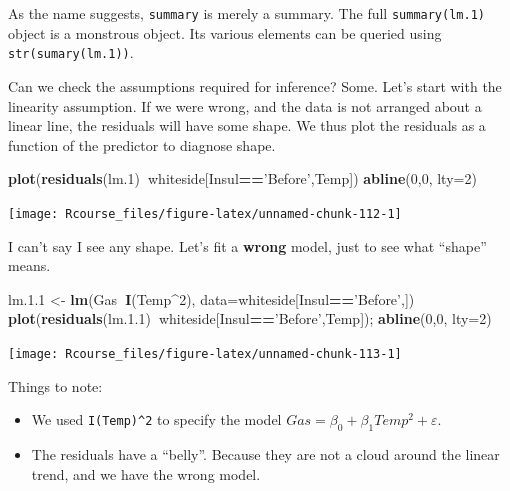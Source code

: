 \documentclass[]{book}
\newenvironment{Shaded}{\begin{snugshade}}{\end{snugshade}}
\newcommand{\KeywordTok}[1]{\textcolor[rgb]{0.13,0.29,0.53}{\textbf{#1}}}
\newcommand{\DataTypeTok}[1]{\textcolor[rgb]{0.13,0.29,0.53}{#1}}
\newcommand{\DecValTok}[1]{\textcolor[rgb]{0.00,0.00,0.81}{#1}}
\newcommand{\FloatTok}[1]{\textcolor[rgb]{0.00,0.00,0.81}{#1}}
\newcommand{\StringTok}[1]{\textcolor[rgb]{0.31,0.60,0.02}{#1}}
\newcommand{\OperatorTok}[1]{\textcolor[rgb]{0.81,0.36,0.00}{\textbf{#1}}}
\newcommand{\NormalTok}[1]{#1}
\providecommand{\tightlist}{%
  \setlength{\itemsep}{0pt}\setlength{\parskip}{0pt}}
\theoremstyle{definition}
\theoremstyle{definition}
\theoremstyle{definition}
\theoremstyle{remark}
\begin{document}
As the name suggests, \texttt{summary} is merely a summary. The full
\texttt{summary(lm.1)} object is a monstrous object. Its various
elements can be queried using \texttt{str(sumary(lm.1))}.

Can we check the assumptions required for inference? Some. Let's start
with the linearity assumption. If we were wrong, and the data is not
arranged about a linear line, the residuals will have some shape. We
thus plot the residuals as a function of the predictor to diagnose
shape.

\begin{Shaded}
\begin{Highlighting}[]
\KeywordTok{plot}\NormalTok{(}\KeywordTok{residuals}\NormalTok{(lm.}\DecValTok{1}\NormalTok{)}\OperatorTok{~}\NormalTok{whiteside[Insul}\OperatorTok{==}\StringTok{'Before'}\NormalTok{,Temp])}
\KeywordTok{abline}\NormalTok{(}\DecValTok{0}\NormalTok{,}\DecValTok{0}\NormalTok{, }\DataTypeTok{lty=}\DecValTok{2}\NormalTok{)}
\end{Highlighting}
\end{Shaded}

\texttt{[image: Rcourse\_files/figure-latex/unnamed-chunk-112-1]}

I can't say I see any shape. Let's fit a \textbf{wrong} model, just to
see what ``shape'' means.

\begin{Shaded}
\begin{Highlighting}[]
\NormalTok{lm.}\FloatTok{1.1}\NormalTok{ <-}\StringTok{ }\KeywordTok{lm}\NormalTok{(Gas}\OperatorTok{~}\KeywordTok{I}\NormalTok{(Temp}\OperatorTok{^}\DecValTok{2}\NormalTok{), }\DataTypeTok{data=}\NormalTok{whiteside[Insul}\OperatorTok{==}\StringTok{'Before'}\NormalTok{,])}
\KeywordTok{plot}\NormalTok{(}\KeywordTok{residuals}\NormalTok{(lm.}\FloatTok{1.1}\NormalTok{)}\OperatorTok{~}\NormalTok{whiteside[Insul}\OperatorTok{==}\StringTok{'Before'}\NormalTok{,Temp]); }\KeywordTok{abline}\NormalTok{(}\DecValTok{0}\NormalTok{,}\DecValTok{0}\NormalTok{, }\DataTypeTok{lty=}\DecValTok{2}\NormalTok{)}
\end{Highlighting}
\end{Shaded}

\texttt{[image: Rcourse\_files/figure-latex/unnamed-chunk-113-1]}

Things to note:

\begin{itemize}
\tightlist
\item
  We used \texttt{I(Temp)\^{}2} to specify the model
  \(Gas=\beta_0 + \beta_1 Temp^2+ \varepsilon\).
\item
  The residuals have a ``belly''. Because they are not a cloud around
  the linear trend, and we have the wrong model.
\end{itemize}
\end{document}
